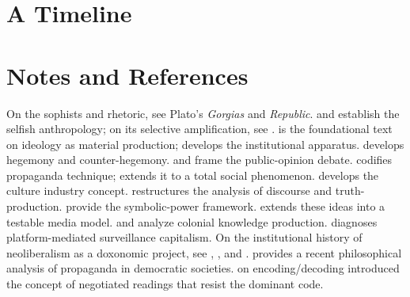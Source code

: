 \section{A Timeline}

\begin{center}
\end{center}
\vspace{1.5em}


\section{Notes and References}
\label{sec:ch3-notes}

On the sophists and rhetoric, see Plato's \textit{Gorgias} and \textit{Republic}.
\textcite{hobbes1651} and \textcite{mandeville1714} establish the selfish anthropology; on its selective amplification, see \textcite{mcCloskey2006}.
\textcite{marx1846} is the foundational text on ideology as material production; \textcite{althusser1970} develops the institutional apparatus.
\textcite{gramsci1971} develops hegemony and counter-hegemony.
\textcite{lippmann1922} and \textcite{dewey1927} frame the public-opinion debate.
\textcite{bernays1928} codifies propaganda technique; \textcite{ellul1965} extends it to a total social phenomenon.
\textcite{adorno1944} develops the culture industry concept.
\textcite{foucault1971} restructures the analysis of discourse and truth-production.
\textcite{bourdieu1984, bourdieu1991} provide the symbolic-power framework.
\textcite{herman1988} extends these ideas into a testable media model.
\textcite{said1978} and \textcite{fanon1961} analyze colonial knowledge production.
\textcite{zuboff2019} diagnoses platform-mediated surveillance capitalism.
On the institutional history of neoliberalism as a doxonomic project, see \textcite{mirowski2009}, \textcite{mayer2016}, and \textcite{slobodian2018}.
\textcite{stanley2015} provides a recent philosophical analysis of propaganda in democratic societies.
\textcite{hall1980} on encoding/decoding introduced the concept of negotiated readings that resist the dominant code.


